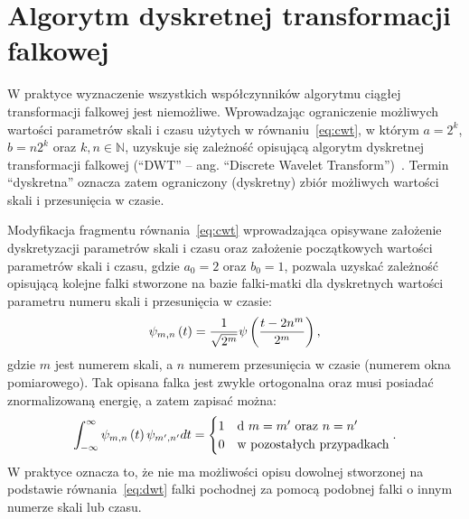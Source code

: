 \section{Algorytm dyskretnej transformacji falkowej}

W praktyce wyznaczenie wszystkich współczynników algorytmu ciągłej transformacji falkowej jest niemożliwe. Wprowadzając ograniczenie możliwych wartości parametrów skali i czasu użytych w równaniu~\eqref{eq:cwt}, w którym $a = 2^k$, $b = n2^k$ oraz $k, n \in \mathbb{N}$, uzyskuje się zależność opisującą algorytm dyskretnej transformacji falkowej (\enquote{DWT} -- ang. \enquote{Discrete Wavelet Transform})~\cite{wallen_handbook}. Termin \enquote{dyskretna} oznacza zatem ograniczony (dyskretny) zbiór możliwych wartości skali i przesunięcia w czasie.

Modyfikacja fragmentu równania~\eqref{eq:cwt} wprowadzająca opisywane założenie dyskretyzacji parametrów skali i czasu oraz założenie początkowych wartości parametrów skali i czasu, gdzie $a_{0} = 2$ oraz $b_{0} = 1$, pozwala uzyskać zależność opisującą kolejne falki stworzone na bazie falki-matki dla dyskretnych wartości parametru numeru skali i przesunięcia w czasie:
\begin{equation}
\psi_{m,n} \left(t\right) = \frac{1}{\sqrt{2^{m}}} \psi \left(\frac{t-2n^{m}}{2^{m}}\right) \label{eq:dwt_wavelet},
\end{equation}
gdzie $m$ jest numerem skali, a $n$ numerem przesunięcia w czasie (numerem okna pomiarowego). Tak opisana falka jest zwykle ortogonalna oraz musi posiadać znormalizowaną energię, a zatem zapisać można:
\begin{equation}
\int _{-\infty} ^{\infty} \psi_{m,n} \emb{t} \psi_{m',n'} dt =
\begin{cases}
	1 & $d $ m = m' $ oraz $ n = n' \\
	0 & $w pozostałych przypadkach$
\end{cases}
\label{eq:dwt_orthogonal}.
\end{equation}
W praktyce oznacza to, że nie ma możliwości opisu dowolnej stworzonej na podstawie równania~\eqref{eq:dwt} falki pochodnej za pomocą podobnej falki o innym numerze skali lub czasu.

